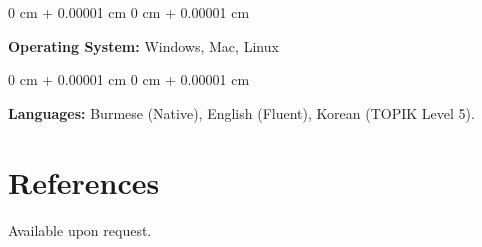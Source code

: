\documentclass[10pt, letterpaper]{article}
\newenvironment{onecolentry}{
    \begin{adjustwidth}{
        0 cm + 0.00001 cm
    }{
        0 cm + 0.00001 cm
    }
}{
    \end{adjustwidth}
} %
\begin{document}
        \vspace{0.2 cm}

        \begin{onecolentry}
        \textbf{Operating System:} Windows, Mac, Linux \end{onecolentry}

        \vspace{0.2 cm}

        \begin{onecolentry}
        \textbf{Languages:} Burmese (Native), English (Fluent), Korean (TOPIK Level 5).
        \end{onecolentry}
\section*{References}
Available upon request.
\end{document}
